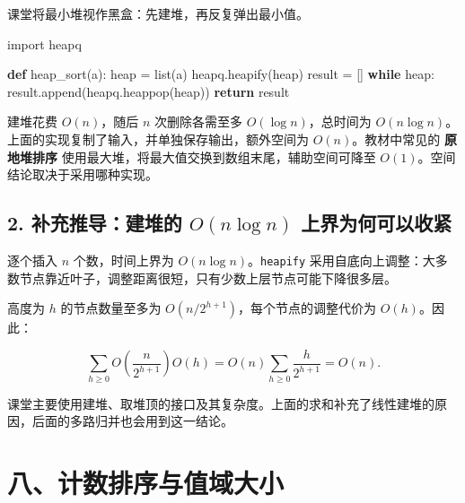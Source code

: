 \documentclass[
  UTF8,fontset=none,zihao=5]{ctexart}
\newenvironment{Shaded}{}{}
\newcommand{\BuiltInTok}[1]{#1}
\newcommand{\ControlFlowTok}[1]{\textcolor[rgb]{0.00,0.44,0.13}{\textbf{#1}}}
\newcommand{\ImportTok}[1]{#1}
\newcommand{\KeywordTok}[1]{\textcolor[rgb]{0.00,0.44,0.13}{\textbf{#1}}}
\newcommand{\NormalTok}[1]{#1}
\newcommand{\OperatorTok}[1]{\textcolor[rgb]{0.40,0.40,0.40}{#1}}
\renewenvironment{Shaded}{\begin{snugshade}}{\end{snugshade}}
\let\OldSection\section
\renewcommand{\section}{\Needspace{5\baselineskip}\OldSection}
\let\OldSubsection\subsection
\renewcommand{\subsection}{\Needspace{4\baselineskip}\OldSubsection}
\begin{document}
课堂将最小堆视作黑盒：先建堆，再反复弹出最小值。

\Needspace{116pt}

\begin{Shaded}
\begin{Highlighting}[]
\ImportTok{import}\NormalTok{ heapq}


\KeywordTok{def}\NormalTok{ heap\_sort(a):}
\NormalTok{    heap }\OperatorTok{=} \BuiltInTok{list}\NormalTok{(a)}
\NormalTok{    heapq.heapify(heap)}
\NormalTok{    result }\OperatorTok{=}\NormalTok{ []}
    \ControlFlowTok{while}\NormalTok{ heap:}
\NormalTok{        result.append(heapq.heappop(heap))}
    \ControlFlowTok{return}\NormalTok{ result}
\end{Highlighting}
\end{Shaded}

建堆花费 \(O(n)\)，随后 \(n\) 次删除各需至多 \(O(\log n)\)，总时间为
\(O(n\log n)\)。上面的实现复制了输入，并单独保存输出，额外空间为
\(O(n)\)。教材中常见的 \textbf{原地堆排序}
使用最大堆，将最大值交换到数组末尾，辅助空间可降至
\(O(1)\)。空间结论取决于采用哪种实现。

\hypertarget{ux8865ux5145ux63a8ux5bfcux5efaux5806ux7684-onlog-n-ux4e0aux754cux4e3aux4f55ux53efux4ee5ux6536ux7d27}{%
\subsection{\texorpdfstring{2. 补充推导：建堆的 \(O(n\log n)\)
上界为何可以收紧}{2. 补充推导：建堆的 O(n\textbackslash log n) 上界为何可以收紧}}\label{ux8865ux5145ux63a8ux5bfcux5efaux5806ux7684-onlog-n-ux4e0aux754cux4e3aux4f55ux53efux4ee5ux6536ux7d27}}

逐个插入 \(n\) 个数，时间上界为 \(O(n\log n)\)。\texttt{heapify}
采用自底向上调整：大多数节点靠近叶子，调整距离很短，只有少数上层节点可能下降很多层。

高度为 \(h\) 的节点数量至多为 \(O(n/2^{h+1})\)，每个节点的调整代价为
\(O(h)\)。因此：

\[
\sum_{h\ge0}O\left(\frac{n}{2^{h+1}}\right)O(h)
=O(n)\sum_{h\ge0}\frac{h}{2^{h+1}}
=O(n).
\]

课堂主要使用建堆、取堆顶的接口及其复杂度。上面的求和补充了线性建堆的原因，后面的多路归并也会用到这一结论。

\hypertarget{ux516bux8ba1ux6570ux6392ux5e8fux4e0eux503cux57dfux5927ux5c0f}{%
\section{八、计数排序与值域大小}\label{ux516bux8ba1ux6570ux6392ux5e8fux4e0eux503cux57dfux5927ux5c0f}}
\end{document}
